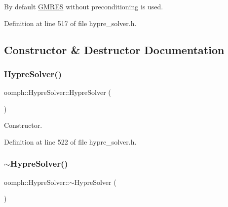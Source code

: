 By default \hyperlink{classoomph_1_1GMRES}{G\+M\+R\+ES} without preconditioning is used. 

Definition at line 517 of file hypre\+\_\+solver.\+h.



\subsection{Constructor \& Destructor Documentation}
\mbox{\label{classoomph_1_1HypreSolver_a69f39b6d9156643103fff1483c9c6e28}} 
\subsubsection{\texorpdfstring{Hypre\+Solver()}{HypreSolver()}\hspace{0.1cm}{\footnotesize\ttfamily [1/2]}}
{\footnotesize\ttfamily oomph\+::\+Hypre\+Solver\+::\+Hypre\+Solver (\begin{DoxyParamCaption}{ }\end{DoxyParamCaption})\hspace{0.3cm}{\ttfamily [inline]}}



Constructor. 



Definition at line 522 of file hypre\+\_\+solver.\+h.

\mbox{\label{classoomph_1_1HypreSolver_a48e1215b0c1cc088369fb78f5ca58b72}} 
\subsubsection{\texorpdfstring{$\sim$\+Hypre\+Solver()}{~HypreSolver()}}
{\footnotesize\ttfamily oomph\+::\+Hypre\+Solver\+::$\sim$\+Hypre\+Solver (\begin{DoxyParamCaption}{ }\end{DoxyParamCaption})\hspace{0.3cm}{\ttfamily [inline]}}



